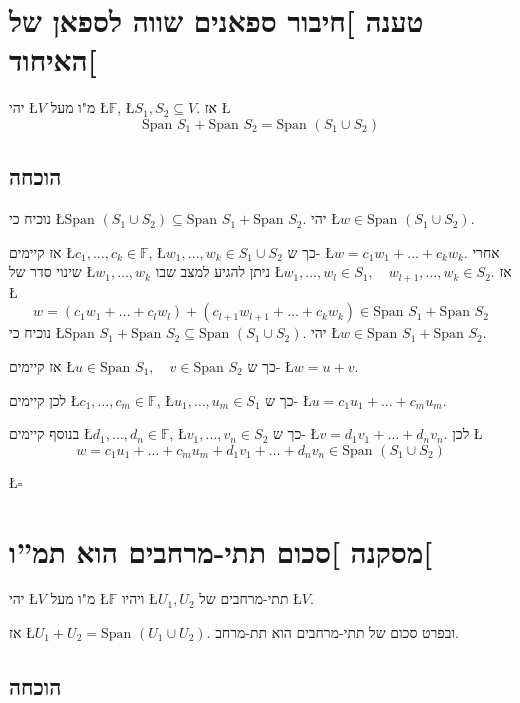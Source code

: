 \documentclass[english,hebrew]{article}
\newcommand{\spn}{\text{Span }}
\begin{document}
\section{טענה {]}חיבור ספאנים שווה לספאן של האיחוד{[}}

יהי \L{$V$} מ"ו מעל \L{$\mathbb{F}$}, \L{$S_{1},S_{2}\subseteq V$}.
אז \L{%
\[
\spn S_{1}+\spn S_{2}=\spn(S_{1}\cup S_{2})
\]
}%

\subsection{הוכחה}

נוכיח כי \L{$\spn(S_{1}\cup S_{2})\subseteq\spn S_{1}+\spn S_{2}$}.
יהי \L{$w\in\spn(S_{1}\cup S_{2})$}.

אז קיימים \L{$c_{1},\dots,c_{k}\in\mathbb{F}$}, \L{$w_{1},\dots,w_{k}\in S_{1}\cup S_{2}$}
כך ש- \L{$w=c_{1}w_{1}+\dots+c_{k}w_{k}$}. אחרי שינוי סדר של \L{$w_{1},\dots,w_{k}$}
ניתן להגיע למצב שבו \L{$w_{1},\dots,w_{l}\in S_{1},\quad w_{l+1},\dots,w_{k}\in S_{2}$}.
אז \L{%
\[
w=(c_{1}w_{1}+\dots+c_{l}w_{l})+(c_{l+1}w_{l+1}+\dots+c_{k}w_{k})\in\spn S_{1}+\spn S_{2}
\]
}%
נוכיח כי \L{$\spn S_{1}+\spn S_{2}\subseteq\spn(S_{1}\cup S_{2})$}.
יהי \L{$w\in\spn S_{1}+\spn S_{2}$}.

אז קיימים \L{$u\in\spn S_{1},\quad v\in\spn S_{2}$} כך ש- \L{$w=u+v$}.

לכן קיימים \L{$c_{1},\dots,c_{m}\in\mathbb{F}$}, \L{$u_{1},\dots,u_{m}\in S_{1}$}
כך ש- \L{$u=c_{1}u_{1}+\dots+c_{m}u_{m}$}.

בנוסף קיימים \L{$d_{1},\dots,d_{n}\in\mathbb{F}$}, \L{$v_{1},\dots,v_{n}\in S_{2}$}
כך ש- \L{$v=d_{1}v_{1}+\dots+d_{n}v_{n}$}. לכן \L{%
\[
w=c_{1}u_{1}+\dots+c_{m}u_{m}+d_{1}v_{1}+\dots+d_{n}v_{n}\in\spn(S_{1}\cup S_{2})
\]
}%

\begin{flushright}
\L{$\square$}
\par\end{flushright}

\section{מסקנה {]}סכום תתי-מרחבים הוא תמ\textquotedblright ו{[}}

יהי \L{$V$} מ"ו מעל \L{$\mathbb{F}$} ויהיו \L{$U_{1},U_{2}$} תתי-מרחבים
של \L{$V$}.

אז \L{$U_{1}+U_{2}=\spn(U_{1}\cup U_{2})$}. ובפרט סכום של תתי-מרחבים
הוא תת-מרחב. 

\subsection{הוכחה}
\end{document}
